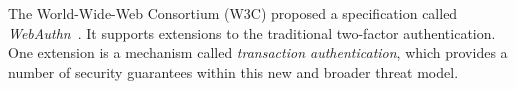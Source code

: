 The World-Wide-Web Consortium (W3C) proposed a specification called \textit{WebAuthn}~\cite{webauthn}. It supports extensions to the traditional two-factor authentication. One extension is a mechanism called \textit{transaction authentication}, which provides a number of security guarantees within this new and broader threat model. 








